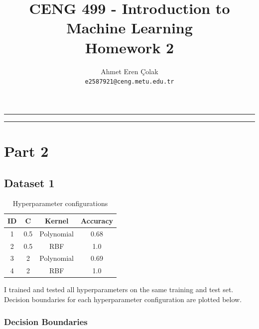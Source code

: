 \documentclass[12pt,a4paper, margin=1in]{article}
\author{
    Ahmet Eren Çolak\\
    \texttt{e2587921@ceng.metu.edu.tr}
}
\title{ 
    \textbf{CENG 499 - Introduction to Machine Learning} \\ Homework 2
}
\begin{document}
\maketitle

\noindent\rule{19cm}{1.2pt}

\tableofcontents

\bigskip
\noindent\rule{19cm}{1.2pt}


\section{Part 2}

\subsection{Dataset 1}

\begin{table}[H]
    \centering
    \begin{tabular}{|c|c|c|c|}
    \hline
    \textbf{ID} & \textbf{C} & \textbf{Kernel}  & \textbf{Accuracy} \\ \hline
    1           & 0.5        & Polynomial       &  0.68 \\ \hline
    2           & 0.5        & RBF              &  1.0  \\ \hline 
    3           & 2          & Polynomial       &  0.69 \\ \hline
    4           & 2          & RBF              &  1.0  \\ \hline
    \end{tabular}
    \caption{Hyperparameter configurations}
\end{table}

I trained and tested all hyperparameters on the same training and test set. Decision boundaries for each hyperparameter
configuration are plotted below.

\subsubsection{Decision Boundaries}
\end{document}

